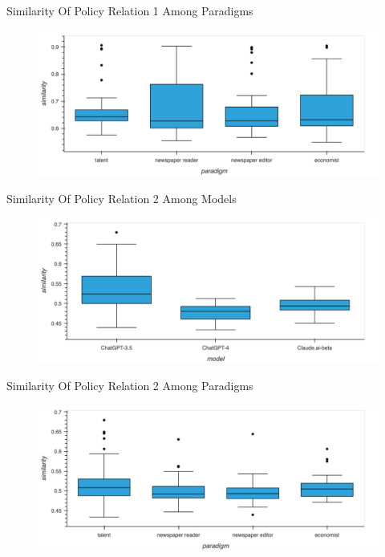 \documentclass[12pt]{beamer}
\begin{document}
\begin{frame}{Similarity Of Policy Relation 1 Among Paradigms}
\begin{figure}[H]
\centering
\includegraphics[width=11.5cm]{Figures/fig28.png}
\end{figure}
\end{frame}


\begin{frame}{Similarity Of Policy Relation 2 Among Models}
\begin{figure}[H]
\centering
\includegraphics[width=11.5cm]{Figures/fig29.png}
\end{figure}
\end{frame}


\begin{frame}{Similarity Of Policy Relation 2 Among Paradigms}
\begin{figure}[H]
\centering
\includegraphics[width=11.5cm]{Figures/fig30.png}
\end{figure}
\end{frame}
\end{document}
